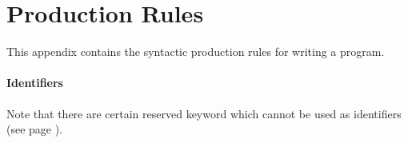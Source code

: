 \chapter{Production Rules}
This appendix contains the syntactic production rules for writing a program.


\subsubsection{Identifiers}

Note that there are certain reserved keyword which cannot be used as
identifiers (see page \pageref{list of reserved keywords}).
